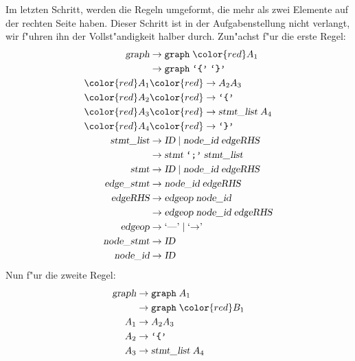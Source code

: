 \begin{loesung}
\begin{teilaufgaben}
Im letzten Schritt, werden die Regeln umgeformt, die mehr als zwei Elemente auf
der rechten Seite haben. Dieser Schritt ist in der Aufgabenstellung nicht verlangt,
wir f"uhren ihn der Vollst"andigkeit halber durch. Zun"achst f"ur die erste Regel:
\begin{align*}
\textsl{graph}     &\rightarrow \texttt{graph}\; {\color{red}A_1} \\
                   &\rightarrow \texttt{graph}\; \texttt{`\{'}\; \texttt{`\}'} \\
\color{red}A_1     &\color{red}\rightarrow A_2A_3\\
\color{red}A_2     &\color{red}\rightarrow \texttt{`\{'}\\
\color{red}A_3     &\color{red}\rightarrow \textsl{stmt\_list}\;A_4\\
\color{red}A_4     &\color{red}\rightarrow \texttt{`\}'}\\
\textsl{stmt\_list}&\rightarrow \textsl{ID}\; |\;
                                \textsl{node\_id}\; \textsl{edgeRHS} \\
                   &\rightarrow \textsl{stmt}\; \texttt{`;'}\; \textsl{stmt\_list}\\
\textsl{stmt}      &\rightarrow \textsl{ID}\; |\;
                                \textsl{node\_id}\; \textsl{edgeRHS} \\
\textsl{edge\_stmt}&\rightarrow \textsl{node\_id}\; \textsl{edgeRHS} \\
\textsl{edgeRHS}   &\rightarrow \textsl{edgeop}\; \textsl{node\_id}\\
                   &\rightarrow \textsl{edgeop}\; \textsl{node\_id}\; \textsl{edgeRHS}\\
\textsl{edgeop}    &\rightarrow \textrm{`\text{---}'}\; |\; \textrm{`$\rightarrow$'}\; \\
\textsl{node\_stmt}&\rightarrow \textsl{ID} \\
\textsl{node\_id}  &\rightarrow \textsl{ID}
\end{align*}
Nun f"ur die zweite Regel:
\begin{align*}
\textsl{graph}     &\rightarrow \texttt{graph}\; A_1 \\
                   &\rightarrow \texttt{graph}\; \color{red}B_1 \\
A_1                &\rightarrow A_2A_3\\
A_2                &\rightarrow \texttt{`\{'}\\
A_3                &\rightarrow \textsl{stmt\_list}\;A_4\\

\end{align*}
\end{teilaufgaben}
\end{loesung}
